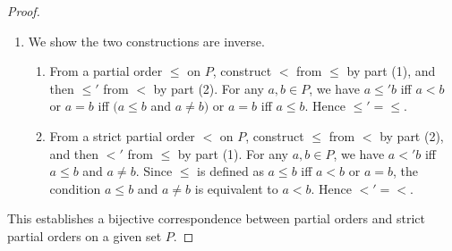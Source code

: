 \begin{proof}
\begin{enumerate}
            For transitivity, suppose $a, b, c \in P$ satisfy $a \leq b$ and $b \leq c$.
            If $a = b$, then $a \leq c$ follows from $b \leq c$.
            If $b = c$, then $a \leq c$ follows from $a \leq b$.
            Otherwise $a < b$ and $b < c$, and transitivity of $<$ (see
            ) gives $a < c$, whence $a \leq c$.
            Thus $\leq$ is transitive, and hence a partial order on $P$.

        \item We show the two constructions are inverse.

            \begin{enumerate}
                \item From a partial order $\leq$ on $P$, construct $<$ from $\leq$ by part (1),
                    and then $\leq'$ from $<$ by part (2). For any $a, b \in P$, we have
                    $a \leq' b$ iff $a < b$ or $a = b$ iff $(a \leq b$ and $a \neq b)$ or $a = b$
                    iff $a \leq b$. Hence $\leq' = \leq$.

                \item From a strict partial order $<$ on $P$, construct $\leq$ from $<$ by part (2),
                    and then $<'$ from $\leq$ by part (1). For any $a, b \in P$, we have
                    $a <' b$ iff $a \leq b$ and $a \neq b$. Since $\leq$ is defined as
                    $a \leq b$ iff $a < b$ or $a = b$, the condition $a \leq b$ and $a \neq b$
                    is equivalent to $a < b$. Hence $<' = <$.
            \end{enumerate}
    \end{enumerate}

    This establishes a bijective correspondence between partial orders and strict partial orders
    on a given set $P$.
\end{proof}